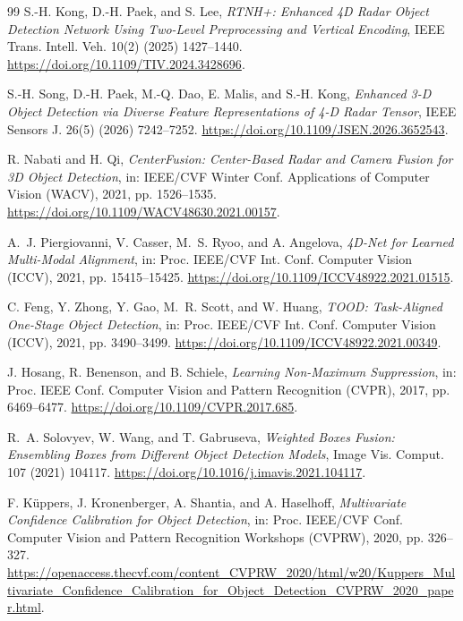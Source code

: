 \begin{thebibliography}{99}
S.-H. Kong, D.-H. Paek, and S. Lee,
\emph{RTNH+: Enhanced 4D Radar Object Detection Network Using Two-Level
Preprocessing and Vertical Encoding},
IEEE Trans. Intell. Veh. 10(2) (2025) 1427--1440.
\url{https://doi.org/10.1109/TIV.2024.3428696}.

S.-H. Song, D.-H. Paek, M.-Q. Dao, E. Malis, and S.-H. Kong,
\emph{Enhanced 3-D Object Detection via Diverse Feature Representations of
4-D Radar Tensor},
IEEE Sensors J. 26(5) (2026) 7242--7252.
\url{https://doi.org/10.1109/JSEN.2026.3652543}.

R. Nabati and H. Qi,
\emph{CenterFusion: Center-Based Radar and Camera Fusion for 3D Object
Detection},
in: IEEE/CVF Winter Conf. Applications of Computer Vision (WACV), 2021,
pp. 1526--1535.
\url{https://doi.org/10.1109/WACV48630.2021.00157}.

A.~J. Piergiovanni, V. Casser, M.~S. Ryoo, and A. Angelova,
\emph{4D-Net for Learned Multi-Modal Alignment},
in: Proc. IEEE/CVF Int. Conf. Computer Vision (ICCV), 2021,
pp. 15415--15425.
\url{https://doi.org/10.1109/ICCV48922.2021.01515}.

C. Feng, Y. Zhong, Y. Gao, M.~R. Scott, and W. Huang,
\emph{TOOD: Task-Aligned One-Stage Object Detection},
in: Proc. IEEE/CVF Int. Conf. Computer Vision (ICCV), 2021,
pp. 3490--3499.
\url{https://doi.org/10.1109/ICCV48922.2021.00349}.

J. Hosang, R. Benenson, and B. Schiele,
\emph{Learning Non-Maximum Suppression},
in: Proc. IEEE Conf. Computer Vision and Pattern Recognition (CVPR), 2017,
pp. 6469--6477.
\url{https://doi.org/10.1109/CVPR.2017.685}.

R.~A. Solovyev, W. Wang, and T. Gabruseva,
\emph{Weighted Boxes Fusion: Ensembling Boxes from Different Object Detection
Models},
Image Vis. Comput. 107 (2021) 104117.
\url{https://doi.org/10.1016/j.imavis.2021.104117}.

F. K\"uppers, J. Kronenberger, A. Shantia, and A. Haselhoff,
\emph{Multivariate Confidence Calibration for Object Detection},
in: Proc. IEEE/CVF Conf. Computer Vision and Pattern Recognition Workshops
(CVPRW), 2020, pp. 326--327.
\url{https://openaccess.thecvf.com/content_CVPRW_2020/html/w20/Kuppers_Multivariate_Confidence_Calibration_for_Object_Detection_CVPRW_2020_paper.html}.


\end{thebibliography}
